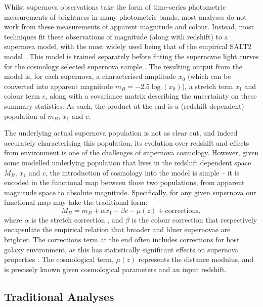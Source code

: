 \documentclass[a4paper,fleqn,usenatbib]{mnras}
\begin{document}
Whilst supernova observations take the form of time-series photometric measurements of brightness in many photometric bands, most analyses do not work from these measurements of apparent magnitude and colour. Instead, most techniques fit these observations of magnitude (along with redshift) to a supernova model, with the most widely used being that of the empirical SALT2 model \citep{Guy2007, Guy2010}. This model is trained separately before fitting the supernovae light curves for the cosmology selected supernova sample \citep{Guy2010, Mosher2014}. The resulting output from the model is, for each supernova, a characterised amplitude $x_0$ (which can be converted into apparent magnitude $m_B = -2.5\log(x_0)$), a stretch term $x_1$ and colour term $c$, along with a covariance matrix describing the uncertainty on these summary statistics. As such, the product at the end is a (redshift dependent) population of $m_B$, $x_1$ and $c$.

The underlying actual supernova population is not as clear cut, and indeed accurately characterising this population, its evolution over redshift and effects from environment is one of the challenges of supernova cosmology. However, given some modelled underlying population that lives in the redshift dependent space $M_B$, $x_1$ and $c$, the introduction of cosmology into the model is simple -- it is encoded in the functional map between those two populations, from apparent magnitude space to absolute magnitude. Specifically, for any given supernova our functional map may take the traditional form:
\begin{equation}
M_B = m_B + \alpha x_1 - \beta c - \mu(z) + \text{corrections},
\end{equation}
where $\alpha$ is the stretch correction \citep{Phillips1993}, and $\beta$ is the colour correction \citep{Tripp1998} that respectively encapsulate the empirical relation that broader and bluer supernovae are brighter. The $\text{corrections}$ term at the end often includes corrections for host galaxy environment, as this has statistically significant effects on supernova properties \citep{Kelly2010, Lampeitl2010, Sullivan2010, DAndrea2011, Gupta2011, Johansson2013, Rigault2013, Uddin2017}. The cosmological term, $\mu(z)$ represents the distance modulus, and is precisely known given cosmological parameters and an input redshift.

\subsection{Traditional Analyses}
\end{document}
